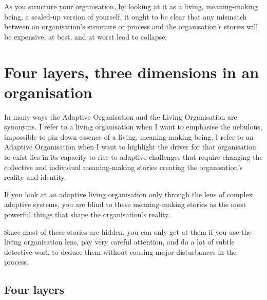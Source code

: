 As you structure your organisation, by looking at it as a living, meaning\hyp{}making being, a scaled-up version of yourself, it ought to be clear that any mismatch between an organisation's structure or process and the organisation's stories will be expensive, at best, and at worst lead to collapse. 






\section{Four layers, three dimensions in an organisation}
\label{section:adaptive-organisations}


In many ways the Adaptive Organisation and the Living Organisation are synonyms. I refer to a living organisation when I want to emphasise the nebulous, impossible to pin down essence of a living, meaning\hyp{}making being. I refer to an Adaptive Organisation when I want to highlight the driver for that organisation to exist lies in its capacity to rise to adaptive challenges that require changing the collective and individual meaning\hyp{}making stories creating the organisation’s reality and identity.


If you look at an adaptive living organisation only through the lens of complex adaptive systems, you are blind to these meaning\hyp{}making stories as the most powerful things that shape the organisation's reality. 


Since most of these stories are hidden, you can only get at them if you use the living organisation lens, pay very careful attention, and do a lot of subtle detective work to deduce them without causing major disturbances in the process. 




\subsection{Four layers}


